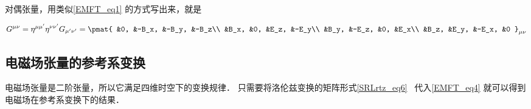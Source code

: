 对偶张量，用类似\autoref{EMFT_eq1} 的方式写出来，就是

\begin{equation}
\begin{aligned}
G^{\mu\nu}=\eta^{\mu\mu'}\eta^{\nu\nu'}G_{\mu'\nu'}=
\pmat{
&0, &-B_x, &-B_y, &-B_z\\ 
&B_x, &0, &E_z, &-E_y\\ 
&B_y, &-E_z, &0, &E_x\\
&B_z, &E_y, &-E_x, &0
}_{\mu\nu}
\end{aligned}
\end{equation}

\subsection{电磁场张量的参考系变换}
电磁场张量是二阶张量，所以它满足四维时空下的变换规律．
只需要将洛伦兹变换的矩阵形式\autoref{SRLrtz_eq6}~ 代入\autoref{EMFT_eq4} 就可以得到电磁场在参考系变换下的结果．

